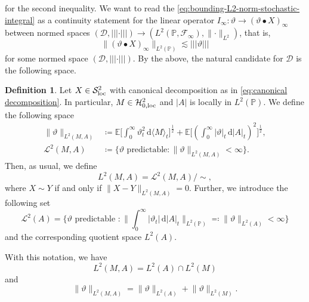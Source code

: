 \documentclass[11pt,a4paper,twoside,openany]{report}
\numberwithin{equation}{section}
\newcommand{\diff}{\mathrm{d}}
\theoremstyle{plain} %
\theoremstyle{definition} %
\newtheorem{definition}[theorem]{Definition}
\theoremstyle{remark} %
\begin{document}
for the second inequality. We want to read the \eqref{eq:bounding-L2-norm-stochastic-integral} as a continuity statement for the linear operator \(I_{\infty}:\vartheta\to (\vartheta\bullet X)_{\infty}\) between normed spaces \( (\mathcal{D},\lvert\lvert\lvert \cdot\rvert\rvert\rvert)\to(L^2(\mathbb{P},\mathcal{F}_{\infty}),\lVert\cdot\rVert_{L^2})\), that is,
\begin{equation*}
    \lVert (\vartheta\bullet X)_{\infty}\rVert_{L^2(\mathbb{P})}\lesssim \lvert\lvert\lvert \vartheta\rvert\rvert\rvert
\end{equation*}
for some normed space  \((\mathcal{D},\lvert\lvert\lvert \cdot\rvert\rvert\rvert)\). By the above, the natural candidate for \(\mathcal{D}\) is the following space.
\begin{definition}\label{def:L2MA}
Let \(X\in\mathcal{S}^2_{\rm{loc}}\) with canonical decomposition as in \eqref{eq:canonical decomposition}. In particular, \(M\in\mathcal{H}^2_{0,\rm{loc}}\) and \(|A|\) is locally in \(L^2(\mathbb{P})\). We define the following space
\begin{align*}
     \lVert \vartheta\rVert_{L^2(M,A)}
     &\coloneqq\mathbb{E}\bigg[\int_0^{\infty} \vartheta_t^2\,\diff \langle M\rangle_t\bigg]^{\frac{1}{2}}
     +\mathbb{E}\bigg[(\int_0^{\infty} |\vartheta|_t\,\diff |A|_t)^2\bigg]^{\frac{1}{2}},\\
     \mathcal{L}^2(M,A)
     &\coloneqq\{\vartheta \text{ predictable}:\lVert \vartheta\rVert_{L^2(M,A)}<\infty\}.
\end{align*}
    Then, as usual, we define
    \begin{equation*}
        L^2(M,A)=\mathcal{L}^2(M,A)/\sim,
    \end{equation*}
    where \(X\sim Y\) if and only if \(\lVert X-Y\rVert_{L^2(M,A)}=0\). 
    Further, we introduce the following set
 \begin{equation*}
        \mathcal{L}^2(A)=\{\vartheta \text{ predictable }:\lVert\int_{0}^{\infty}|\vartheta_t|\,\diff |A|_t\rVert_{L^2(\mathbb{P})}\eqqcolon\lVert \vartheta\rVert_{L^2(A)}<\infty\}
   \end{equation*}
    and the corresponding quotient space \(L^2(A)\).
\end{definition}
With this notation, we have
\begin{equation*}
    L^2(M,A)=L^2(A)\cap L^2(M)
\end{equation*}
and \begin{equation}\label{eq:norm-L2MA}
    \lVert \vartheta\rVert_{L^2(M,A)}=\lVert \vartheta\rVert_{L^2(A)}+\lVert \vartheta\rVert_{L^2(M)}.
\end{equation}
\end{document}
